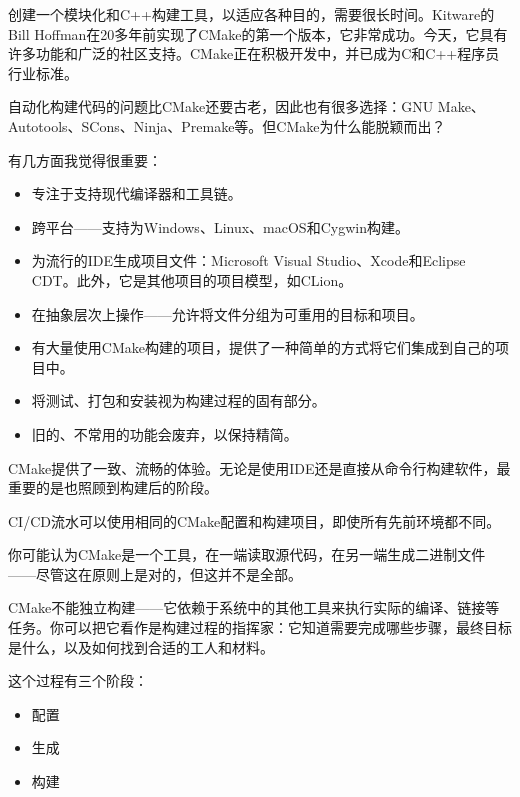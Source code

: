 创建一个模块化和C++构建工具，以适应各种目的，需要很长时间。Kitware的Bill Hoffman在20多年前实现了CMake的第一个版本，它非常成功。今天，它具有许多功能和广泛的社区支持。CMake正在积极开发中，并已成为C和C++程序员行业标准。

自动化构建代码的问题比CMake还要古老，因此也有很多选择：GNU Make、Autotools、SCons、Ninja、Premake等。但CMake为什么能脱颖而出？

有几方面我觉得很重要：

\begin{itemize}
\item
专注于支持现代编译器和工具链。

\item
跨平台——支持为Windows、Linux、macOS和Cygwin构建。

\item
为流行的IDE生成项目文件：Microsoft Visual Studio、Xcode和Eclipse CDT。此外，它是其他项目的项目模型，如CLion。

\item
在抽象层次上操作——允许将文件分组为可重用的目标和项目。

\item
有大量使用CMake构建的项目，提供了一种简单的方式将它们集成到自己的项目中。

\item
将测试、打包和安装视为构建过程的固有部分。

\item
旧的、不常用的功能会废弃，以保持精简。
\end{itemize}

CMake提供了一致、流畅的体验。无论是使用IDE还是直接从命令行构建软件，最重要的是也照顾到构建后的阶段。

CI/CD流水可以使用相同的CMake配置和构建项目，即使所有先前环境都不同。


你可能认为CMake是一个工具，在一端读取源代码，在另一端生成二进制文件——尽管这在原则上是对的，但这并不是全部。

CMake不能独立构建——它依赖于系统中的其他工具来执行实际的编译、链接等任务。你可以把它看作是构建过程的指挥家：它知道需要完成哪些步骤，最终目标是什么，以及如何找到合适的工人和材料。

这个过程有三个阶段：

\begin{itemize}
\item
配置

\item
生成

\item
构建
\end{itemize}

